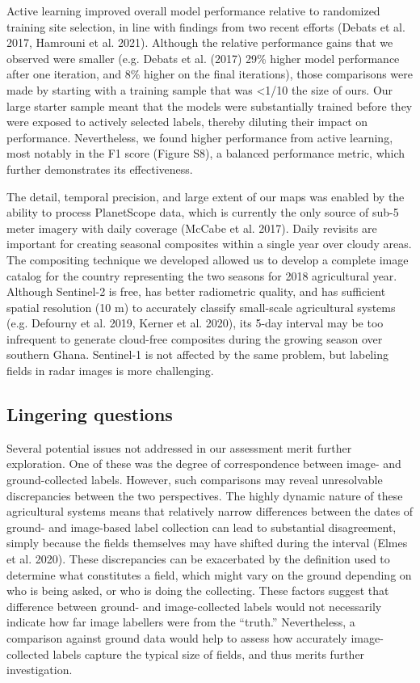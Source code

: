 \documentclass[11pt,a4paper]{article}
\begin{document}
Active learning improved overall model performance relative to
randomized training site selection, in line with findings from two
recent efforts (Debats et al. 2017, Hamrouni et al. 2021). Although the
relative performance gains that we observed were smaller (e.g. Debats et
al. (2017) 29\% higher model performance after one iteration, and 8\%
higher on the final iterations), those comparisons were made by starting
with a training sample that was \textless1/10 the size of ours. Our
large starter sample meant that the models were substantially trained
before they were exposed to actively selected labels, thereby diluting
their impact on performance. Nevertheless, we found higher performance
from active learning, most notably in the F1 score (Figure S8), a
balanced performance metric, which further demonstrates its
effectiveness.

The detail, temporal precision, and large extent of our maps was enabled
by the ability to process PlanetScope data, which is currently the only
source of sub-5 meter imagery with daily coverage (McCabe et al. 2017).
Daily revisits are important for creating seasonal composites within a
single year over cloudy areas. The compositing technique we developed
allowed us to develop a complete image catalog for the country
representing the two seasons for 2018 agricultural year. Although
Sentinel-2 is free, has better radiometric quality, and has sufficient
spatial resolution (10 m) to accurately classify small-scale
agricultural systems (e.g. Defourny et al. 2019, Kerner et al. 2020),
its 5-day interval may be too infrequent to generate cloud-free
composites during the growing season over southern Ghana. Sentinel-1 is
not affected by the same problem, but labeling fields in radar images is
more challenging.

\hypertarget{lingering-questions}{%
\subsection{Lingering questions}\label{lingering-questions}}

Several potential issues not addressed in our assessment merit further
exploration. One of these was the degree of correspondence between
image- and ground-collected labels. However, such comparisons may reveal
unresolvable discrepancies between the two perspectives. The highly
dynamic nature of these agricultural systems means that relatively
narrow differences between the dates of ground- and image-based label
collection can lead to substantial disagreement, simply because the
fields themselves may have shifted during the interval (Elmes et al.
2020). These discrepancies can be exacerbated by the definition used to
determine what constitutes a field, which might vary on the ground
depending on who is being asked, or who is doing the collecting. These
factors suggest that difference between ground- and image-collected
labels would not necessarily indicate how far image labellers were from
the ``truth.'' Nevertheless, a comparison against ground data would help
to assess how accurately image-collected labels capture the typical size
of fields, and thus merits further investigation.
\end{document}
